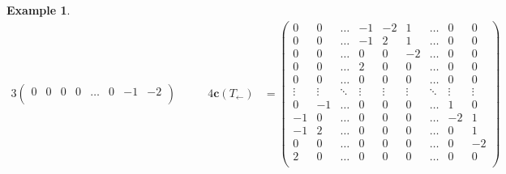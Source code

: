 \documentclass{amsart}
\theoremstyle{definition}
\newtheorem{example}[theorem]{Example}
\renewcommand{\b}[1]{{\boldsymbol{#1}}} %
\begin{document}
\begin{example}
\begin{table}
\begin{alignat*}{3}
\begin{pmatrix}
		0 & 0 & 0 & 0 & \dots & 0 & -1 & -2 \\
	\end{pmatrix}
	\qquad &
	4\b{c}(T_\leftarrow) & = \begin{pmatrix}
		0 & 0 & \dots & -1 & -2 & 1 & \dots & 0 & 0 \\
		0 & 0 & \dots & -1 & 2 & 1 & \dots & 0 & 0 \\
		0 & 0 & \dots & 0 & 0 & -2 & \dots & 0 & 0 \\
		0 & 0 & \dots & 2 & 0 & 0 & \dots & 0 & 0 \\
		0 & 0 & \dots & 0 & 0 & 0 & \dots & 0 & 0 \\
		\vdots & \vdots & \ddots & \vdots & \vdots & \vdots & \ddots & \vdots & \vdots \\
		0 & -1 & \dots & 0 & 0 & 0 & \dots & 1 & 0 \\
		-1 & 0 & \dots & 0 & 0 & 0 & \dots & -2 & 1 \\
		-1 & 2 & \dots & 0 & 0 & 0 & \dots & 0 & 1 \\
		0 & 0 & \dots & 0 & 0 & 0 & \dots & 0 & -2 \\
		2 & 0 & \dots & 0 & 0 & 0 & \dots & 0 & 0 \\
	\end{pmatrix}
	\\[.3cm]

\end{alignat*}
\end{table}
\end{example}
\end{document}
